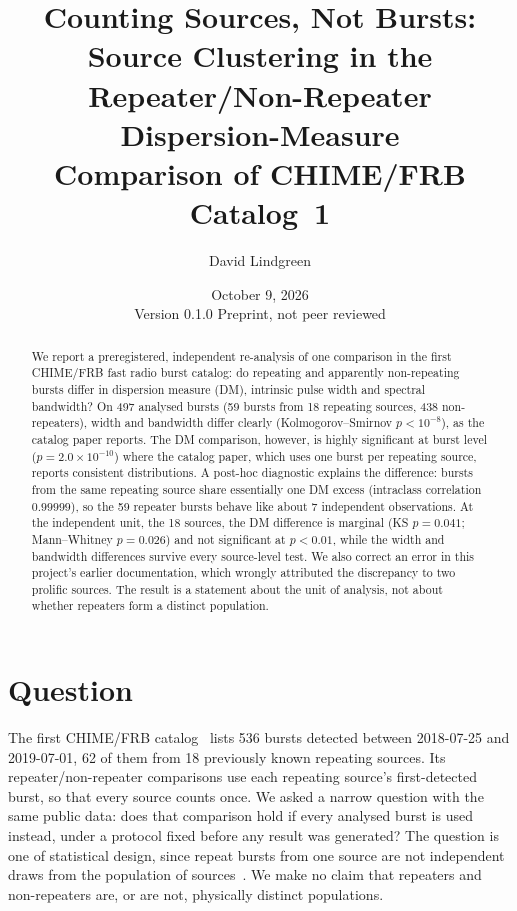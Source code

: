 \documentclass[11pt]{article}
\title{Counting Sources, Not Bursts:\\
Source Clustering in the Repeater/Non-Repeater Dispersion-Measure\\
Comparison of CHIME/FRB Catalog~1}
\author{David Lindgreen}
\date{October 9, 2026 \\[2pt] \small Version 0.1.0 \quad Preprint, not peer reviewed}
\begin{document}
\maketitle

\begin{abstract}
We report a preregistered, independent re-analysis of one comparison in the first CHIME/FRB fast radio burst
catalog: do repeating and apparently non-repeating bursts differ in dispersion measure (DM), intrinsic pulse width
and spectral bandwidth? On 497 analysed bursts (59 bursts from 18 repeating sources, 438 non-repeaters), width and
bandwidth differ clearly (Kolmogorov--Smirnov $p<10^{-8}$), as the catalog paper reports. The DM comparison,
however, is highly significant at burst level ($p=2.0\times10^{-10}$) where the catalog paper, which uses one burst per
repeating source, reports consistent distributions. A post-hoc diagnostic explains the difference: bursts from the same
repeating source share essentially one DM excess (intraclass correlation $0.99999$), so the 59 repeater bursts behave like
about $7$ independent observations. At the independent unit, the 18 sources, the DM difference is marginal (KS $p=0.041$;
Mann--Whitney $p=0.026$) and not significant at $p<0.01$, while the width and bandwidth differences survive every
source-level test. We also correct an error in this project's earlier documentation, which wrongly attributed the
discrepancy to two prolific sources. The result is a statement about the unit of analysis, not about whether repeaters
form a distinct population.
\end{abstract}

\section{Question}
The first CHIME/FRB catalog~\cite{chime2021} lists 536 bursts detected between 2018-07-25 and 2019-07-01, 62 of them
from 18 previously known repeating sources. Its repeater/non-repeater comparisons use each repeating source's
first-detected burst, so that every source counts once. We asked a narrow question with the same public data: does
that comparison hold if every analysed burst is used instead, under a protocol fixed before any result was generated?
The question is one of statistical design, since repeat bursts from one source are not independent draws from the
population of sources~\cite{hurlbert1984}. We make no claim that repeaters and non-repeaters are, or are not,
physically distinct populations.
\end{document}
